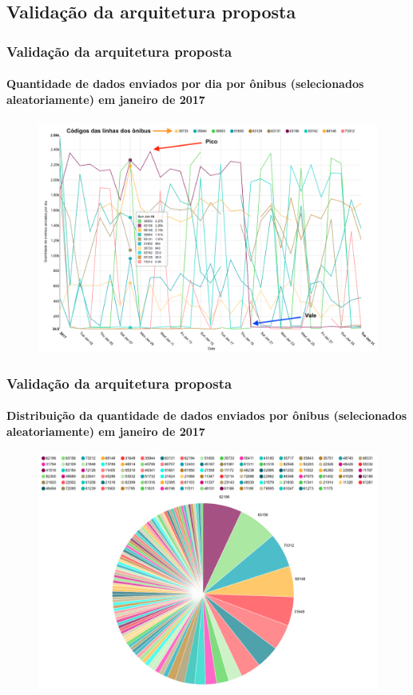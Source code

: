\documentclass{beamer}
\begin{document}
\subsection{Validação da arquitetura proposta}
\begin{frame}
\frametitle{Validação da arquitetura proposta}
\framesubtitle{Quantidade de dados enviados por dia por ônibus (selecionados aleatoriamente) em janeiro de 2017}
\begin{figure}[!htb]%
	\centering
		\includegraphics[width=0.90\linewidth]{analysis_by_bus_lines_pt.png}
	\label{fig:only_one_bus_map}
\end{figure}
\end{frame}
\begin{frame}
\frametitle{Validação da arquitetura proposta}
\framesubtitle{Distribuição da quantidade de dados enviados por ônibus (selecionados aleatoriamente) em janeiro de 2017}
\begin{figure}[!htb]%
	\centering
		\includegraphics[width=0.85\linewidth]{pizza_bus.png}
	\label{fig:buses_map}
\end{figure}
\end{frame}
\end{document}
